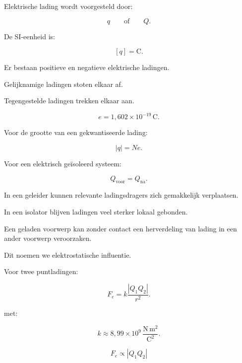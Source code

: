 \documentclass{ximera}
\begin{document}




Elektrische lading wordt voorgesteld door:

\[
q
\qquad\text{of}\qquad
Q.
\]

De SI-eenheid is:

\[
\boxed{
[q]=\mathrm C.
}
\]


Er bestaan positieve en negatieve elektrische ladingen.

Gelijknamige ladingen stoten elkaar af.

Tegengestelde ladingen trekken elkaar aan.



\[
\boxed{
e=1{,}602\times10^{-19}\,\mathrm C.
}
\]

Voor de grootte van een gekwantiseerde lading:

\[
\boxed{
|q|=Ne.
}
\]



Voor een elektrisch geïsoleerd systeem:

\[
\boxed{
Q_\mathrm{voor}=Q_\mathrm{na}.
}
\]



In een geleider kunnen relevante ladingsdragers zich gemakkelijk
verplaatsen.

In een isolator blijven ladingen veel sterker lokaal gebonden.



Een geladen voorwerp kan zonder contact een herverdeling van lading in
een ander voorwerp veroorzaken.

Dit noemen we elektrostatische influentie.



Voor twee puntladingen:

\[
\boxed{
F_e
=
k\frac{|Q_1Q_2|}{r^2}.
}
\]

met:

\[
\boxed{
k\approx8{,}99\times10^9\,
\frac{\mathrm{N\,m^2}}{\mathrm{C^2}}.
}
\]



\[
\boxed{
F_e\propto |Q_1Q_2|
}
\]
\end{document}
